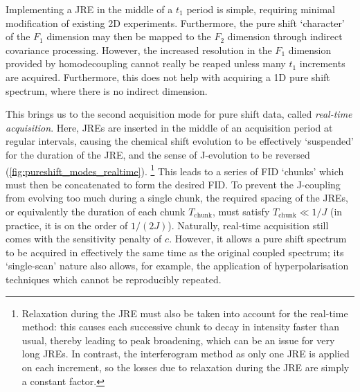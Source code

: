 Implementing a JRE in the middle of a $t_1$ period is simple, requiring minimal modification of existing 2D experiments.
Furthermore, the pure shift `character' of the $F_1$ dimension may then be mapped to the $F_2$ dimension through indirect covariance processing\autocite{Bruschweiler2004JCP,Zhang2004JACS,Jaeger2014ARNMRS,Morris2010JACS,Aguilar2012ACIE,Foroozandeh2014JACS}.
However, the increased resolution in the $F_1$ dimension provided by homodecoupling cannot really be reaped unless many $t_1$ increments are acquired.
Furthermore, this does not help with acquiring a 1D pure shift spectrum, where there is no indirect dimension.

This brings us to the second acquisition mode for pure shift data, called \textit{real-time acquisition}\autocite{Lupulescu2012JMR,Meyer2013ACIE,Mauhart2015JMR,Kiraly2018MRC}.
Here, JREs are inserted in the middle of an acquisition period at regular intervals, causing the chemical shift evolution to be effectively `suspended' for the duration of the JRE, and the sense of J-evolution to be reversed (\cref{fig:pureshift_modes_realtime}).%
\footnote{Relaxation during the JRE must also be taken into account for the real-time method: this causes each successive chunk to decay in intensity faster than usual, thereby leading to peak broadening, which can be an issue for very long JREs.
In contrast, the interferogram method as only one JRE is applied on each increment, so the losses due to relaxation during the JRE are simply a constant factor.}
This leads to a series of FID `chunks' which must then be concatenated to form the desired FID.
To prevent the J-coupling from evolving too much during a single chunk, the required spacing of the JREs, or equivalently the duration of each chunk $T_\text{chunk}$, must satisfy $T_\text{chunk} \ll 1/J$ (in practice, it is on the order of $1/(2J)$).
Naturally, real-time acquisition still comes with the sensitivity penalty of $c$.
However, it allows a pure shift spectrum to be acquired in effectively the same time as the original coupled spectrum; its `single-scan' nature also allows, for example, the application of hyperpolarisation techniques which cannot be reproducibly repeated.\autocite{Donovan2014ACIE,Taylor2021MRC}

